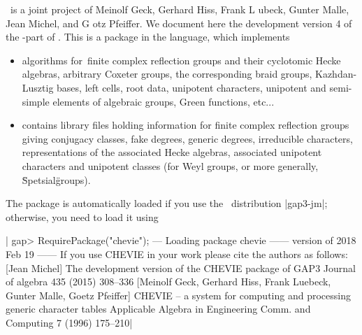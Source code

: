 \def\Sym{{\mathfrak S}}


\CHEVIE\   is  a  joint  project  of  Meinolf  Geck,  Gerhard  Hiss,  Frank
L{  u}beck,  Gunter  Malle,  Jean  Michel,  and G{ o}tz
Pfeiffer.  We document here  the development version  4 of the \GAP-part of
\CHEVIE. This is a package in the  language, which implements

\begin{itemize}
\item
algorithms  for\:\ finite  complex reflection  groups and  their cyclotomic
Hecke  algebras, arbitrary Coxeter groups,  the corresponding braid groups,
Kazhdan-Lusztig   bases,  left  cells,  root  data,  unipotent  characters,
unipotent  and semi-simple  elements of  algebraic groups, Green functions,
etc...
\item
contains  library files  holding information  for finite complex reflection
groups giving conjugacy classes, fake degrees, generic degrees, irreducible
characters,  representations of  the associated  Hecke algebras, associated
unipotent  characters  and  unipotent  classes  (for  Weyl  groups, or more
generally, \"Spetsial\" groups).
\end{itemize}

The  package  is  automatically  loaded  if  you use the \GAP\ distribution
|gap3-jm|; otherwise, you need to load it using

|    gap> RequirePackage("chevie");
    --- Loading package chevie ------ version of 2018 Feb 19 ------
    If you use CHEVIE in your work please cite the authors as follows:
    [Jean Michel] The development version of the CHEVIE package of GAP3
     Journal of algebra 435 (2015) 308--336
    [Meinolf Geck, Gerhard Hiss, Frank Luebeck, Gunter Malle, Goetz Pfeiffer]
     CHEVIE -- a system for computing and processing generic character tables
     Applicable Algebra in Engineering Comm. and Computing 7 (1996) 175--210|

